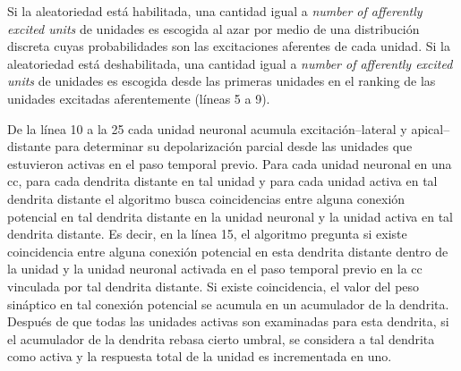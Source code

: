 Si la aleatoriedad está habilitada, una cantidad igual a \emph{number of afferently excited units} de unidades es escogida al azar por medio de una distribución discreta cuyas probabilidades son las excitaciones aferentes de cada unidad. Si la aleatoriedad está deshabilitada, una cantidad igual a \emph{number of afferently excited units} de unidades es escogida desde las primeras unidades en el ranking de las unidades excitadas aferentemente (líneas 5 a 9).


De la línea 10 a la 25 cada unidad neuronal acumula excitación--lateral y apical--distante para determinar su depolarización parcial desde las unidades que estuvieron activas en el paso temporal previo. Para cada unidad neuronal en una \gls{cc}, para cada dendrita distante en tal unidad y para cada unidad activa en tal dendrita distante el algoritmo busca coincidencias entre alguna conexión potencial en tal dendrita distante en la unidad neuronal y la unidad activa en tal dendrita distante. Es decir, en la línea 15, el algoritmo pregunta si existe coincidencia entre alguna conexión potencial en esta dendrita distante dentro de la unidad y la unidad neuronal activada en el paso temporal previo en la \gls{cc} vinculada por tal dendrita distante. Si existe coincidencia, el valor del peso sináptico en tal conexión potencial se acumula en un acumulador de la dendrita. Después de que todas las unidades activas son examinadas para esta dendrita, si el acumulador de la dendrita rebasa cierto umbral, se considera a tal dendrita como activa y la respuesta total de la unidad es incrementada en uno. 


